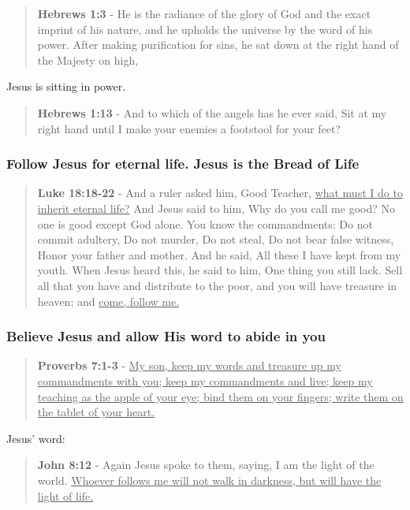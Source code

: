 \documentclass[11pt]{article}
\begin{document}
\begin{quote}
\textbf{Hebrews 1:3} - He is the radiance of the glory of God and the exact imprint of his nature, and he upholds the universe by the word of his power. After making purification for sins, he sat down at the right hand of the Majesty on high,
\end{quote}

Jesus is sitting in power.

\begin{quote}
\textbf{Hebrews 1:13} - And to which of the angels has he ever said, Sit at my right hand until I make your enemies a footstool for your feet?
\end{quote}

\subsubsection{Follow Jesus for eternal life. Jesus is the Bread of Life}
\label{sec:orgc8df81a}
\begin{quote}
\textbf{Luke 18:18-22} - And a ruler asked him, Good Teacher, \uline{what must I do to inherit eternal life?} And Jesus said to him, Why do you call me good? No one is good except God alone. You know the commandments: Do not commit adultery, Do not murder, Do not steal, Do not bear false witness, Honor your father and mother. And he said, All these I have kept from my youth. When Jesus heard this, he said to him, One thing you still lack. Sell all that you have and distribute to the poor, and you will have treasure in heaven; and \uline{come, follow me.}
\end{quote}

\subsubsection{Believe Jesus and allow His word to abide in you}
\label{sec:orga98b2d6}

\begin{quote}
\textbf{Proverbs 7:1-3} - \uline{My son, keep my words and treasure up my commandments with you; keep my commandments and live; keep my teaching as the apple of your eye; bind them on your fingers; write them on the tablet of your heart.}
\end{quote}

Jesus' word:

\begin{quote}
\textbf{John 8:12} - Again Jesus spoke to them, saying, I am the light of the world. \uline{Whoever follows me will not walk in darkness, but will have the light of life.}
\end{quote}
\end{document}
